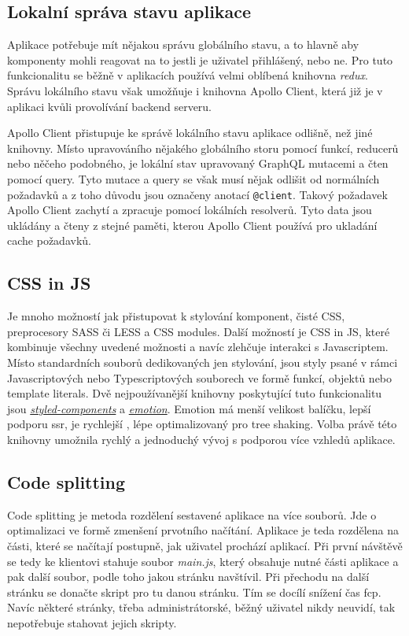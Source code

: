 \subsection{Lokalní správa stavu aplikace}
\label{ss:local_state_management}
Aplikace potřebuje mít nějakou správu globálního stavu, a to hlavně aby komponenty mohli reagovat na to jestli je uživatel přihlášený, nebo ne. Pro tuto funkcionalitu se běžně v aplikacích používá velmi oblíbená knihovna \emph{redux}. Správu lokálního stavu však umožňuje i knihovna Apollo Client, která již je v aplikaci kvůli provolívání backend serveru.

Apollo Client přistupuje ke správě lokálního stavu aplikace odlišně, než jiné knihovny. Místo upravováního nějakého globálního storu pomocí funkcí, reducerů nebo něčeho podobného, je lokální stav upravovaný GraphQL mutacemi a čten pomocí query. Tyto mutace a query se však musí nějak odlišit od normálních požadavků a z toho důvodu jsou označeny anotací \texttt{@client}. Takový požadavek Apollo Client zachytí a zpracuje pomocí lokálních resolverů. Tyto data jsou ukládány a čteny z stejné paměti, kterou Apollo Client používá pro ukladání cache požadavků.

\subsection{CSS in JS}
\label{ss:css_in_js}
Je mnoho možností jak přistupovat k stylování komponent, čisté CSS, preprocesory SASS či LESS a CSS modules. Další možností je CSS in JS, které kombinuje všechny uvedené možnosti a navíc zlehčuje interakci s Javascriptem. Místo standardních souborů dedikovaných jen stylování, jsou styly psané v rámci Javascriptových nebo Typescriptových souborech ve formě funkcí, objektů nebo template literals. Dvě nejpoužívanější knihovny poskytující tuto funkcionalitu jsou \href{https://styled-components.com/}{\emph{styled-components}} a \href{https://emotion.sh/}{\emph{emotion}}. Emotion má menší velikost balíčku, lepší podporu \acrshort{ssr}, je rychlejší \cite{shehet_2020_css}, lépe optimalizovaný pro \gls{tree shaking}. Volba právě této knihovny umožnila rychlý a jednoduchý vývoj s podporou více vzhledů aplikace.

\subsection{Code splitting}
\label{ss:code_splitting}
Code splitting je metoda rozdělení sestavené aplikace na více souborů. Jde o optimalizaci ve formě zmenšení prvotního načítání. Aplikace je teda rozdělena na části, které se načítají postupně, jak uživatel prochází aplikací. Při první návštěvě se tedy ke klientovi stahuje soubor \emph{main.js}, který obsahuje nutné části aplikace a pak další soubor, podle toho jakou stránku navštívil. Při přechodu na další stránku se donačte skript pro tu danou stránku. Tím se docílí snížení čas \acrshort{fcp}. Navíc některé stránky, třeba administrátorské, běžný uživatel nikdy neuvidí, tak nepotřebuje stahovat jejich skripty.

